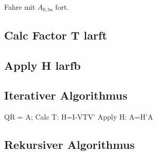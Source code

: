 Fahre mit $A_{0, \text{bs}}$ fort.

\subsection{Calc Factor T larft}
\cite{Joffrain:2006:AHT:1141885.1141886}

\subsection{Apply H larfb}


\subsection{Iterativer Algorithmus}

\begin{algorithmic}
	\State QR = A;
		\State Calc T: H=I-VTV'
		\State Apply H: A=H'A
	\EndIf
\EndFor

\end{algorithmic}


\subsection{Rekursiver Algorithmus}


